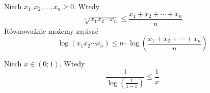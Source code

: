 \begin{fact}\label{F:AM_GM}
Niech $x_1,x_2,\dots,x_n\ge 0$. Wtedy
\[
    \sqrt[n]{x_1x_2\cdots x_n} \le \frac{x_1 + x_2 + \cdots + x_n}{n}
\]
Równoważnie możemy zapisać
\[
    \log(x_1x_2\cdots x_n) \le n\cdot \log\left(\frac{x_1 + x_2 + \cdots + x_n}{n}\right)
\]
\end{fact}

\begin{fact}\label{F:log_vs_x}
Niech $x \in (0;1)$. Wtedy
\[
    \frac{1}{\log(\frac{1}{1-x})} \le \frac{1}{x}
\]
\end{fact}